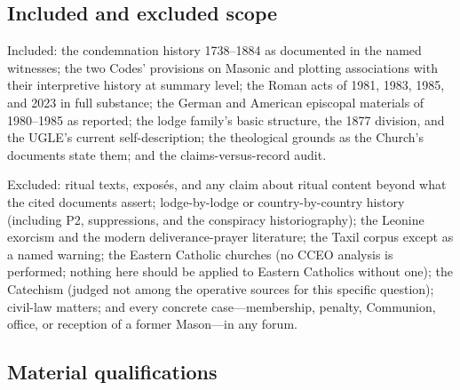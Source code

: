 \subsection{Included and excluded scope}

Included: the condemnation history 1738--1884 as documented in the named witnesses; the two Codes' provisions on Masonic and plotting associations with their interpretive history at summary level; the Roman acts of 1981, 1983, 1985, and 2023 in full substance; the German and American episcopal materials of 1980--1985 as reported; the lodge family's basic structure, the 1877 division, and the UGLE's current self-description; the theological grounds as the Church's documents state them; and the claims-versus-record audit.

Excluded: ritual texts, expos\'es, and any claim about ritual content beyond what the cited documents assert; lodge-by-lodge or country-by-country history (including P2, suppressions, and the conspiracy historiography); the Leonine exorcism and the modern deliverance-prayer literature; the Taxil corpus except as a named warning; the Eastern Catholic churches (no CCEO analysis is performed; nothing here should be applied to Eastern Catholics without one); the Catechism (judged not among the operative sources for this specific question); civil-law matters; and every concrete case---membership, penalty, Communion, office, or reception of a former Mason---in any forum.

\subsection{Material qualifications}

